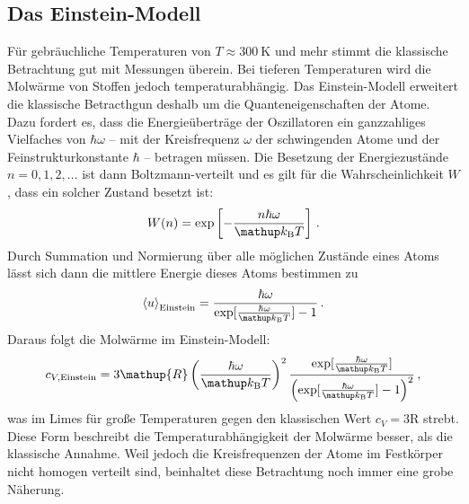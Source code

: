 \subsection{Das Einstein-Modell}
\label{subsec:einstein}
Für gebräuchliche Temperaturen von $T \approx \SI{300}{\kelvin}$ und mehr
stimmt die klassische Betrachtung gut mit Messungen überein.
Bei tieferen Temperaturen wird die Molwärme von Stoffen jedoch
temperaturabhängig.
Das Einstein-Modell erweitert die klassische Betracthgun deshalb um die
Quanteneigenschaften der Atome. Dazu fordert es, dass die Energieüberträge
der Oszillatoren ein ganzzahliges Vielfaches von $\hbar\omega$ -- mit
der Kreisfrequenz $\omega$ der schwingenden Atome und der
Feinstrukturkonstante $\hbar$ -- betragen müssen.
Die Besetzung der Energiezustände $n = 0,1,2,\dots$ ist dann Boltzmann-verteilt
und es gilt für die Wahrscheinlichkeit $W$, dass ein solcher Zustand besetzt
ist:
\begin{equation}
    \label{eqn:boltzmann}
    W(n) = \exp\left[-\frac{n\hbar\omega}{\kb T}\right]\,.
\end{equation}
Durch Summation und Normierung über alle möglichen Zustände eines Atoms
lässt sich dann die mittlere Energie dieses Atoms bestimmen zu
\begin{equation}
    \label{eqn:u_einstein}
    \left<u\right>_\text{Einstein} =
    \frac{\hbar\omega}{\exp[\frac{\hbar\omega}{\kb T}] - 1}\,.
\end{equation}
Daraus folgt die Molwärme im Einstein-Modell:
\begin{equation}
    \label{eqn:cv_einstein}
    c_{V,\text{Einstein}} =
    3\mathup{R}\left(\frac{\hbar\omega}{\kb T}\right)^2
    \frac{
        \exp[\frac{\hbar\omega}{\kb T}]
    }{
        \left(\exp[\frac{\hbar\omega}{\kb T}] - 1\right)^2
    }\,,
\end{equation}
was im Limes für große Temperaturen gegen den klassischen Wert
$c_V = 3\mathup{R}$ strebt.
Diese Form beschreibt die Temperaturabhängigkeit der Molwärme besser, als
die klassische Annahme. Weil jedoch die Kreisfrequenzen der Atome im Festkörper
nicht homogen verteilt sind, beinhaltet diese Betrachtung noch immer eine grobe
Näherung.

